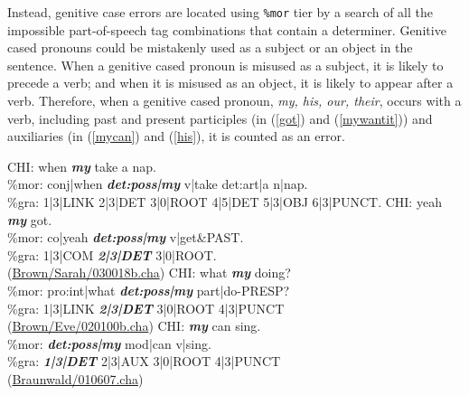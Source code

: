 Instead, genitive case errors are located using \texttt{\%mor} tier by a search of all the impossible part-of-speech tag combinations that contain a determiner. Genitive cased pronouns could be mistakenly used as a subject or an object in the sentence. When a genitive cased pronoun is misused as a subject, it is likely to precede a verb; and when it is misused as an object, it is likely to appear after a verb. Therefore, when a genitive cased pronoun, \textit{my, his, our, their}, occurs with a verb, including past and present participles (in (\ref{got}) and (\ref{mywantit})) and auxiliaries (in (\ref{mycan}) and (\ref{his}), it is counted as an error. 

\begin{exe}
\ex \label{} \gll *CHI:	when \textit{\textbf{my}} take a nap. \\
\%mor:	conj|when \textit{\textbf{det:poss|my}} v|take det:art|a n|nap.\\
\%gra:	1|3|LINK 2|3|DET 3|0|ROOT 4|5|DET 5|3|OBJ 6|3|PUNCT.
\ex \label{got} \gll *CHI: yeah \textit{\textbf{my}} got.\\
\%mor: co|yeah \textit{\textbf{det:poss|my}} v|get&PAST.\\
\%gra: 1|3|COM \textit{\textbf{2|3|DET }} 3|0|ROOT.\\
(\href{https://childes.talkbank.org/browser/index.php?url=Eng-NA/Brown/Sarah/030018b.cha}{Brown/Sarah/030018b.cha})
\ex \label{mywantit} \gll  *CHI: what \textit{\textbf{my}}  doing?  \\     
\%mor:	pro:int|what \textit{\textbf{det:poss|my}} part|do-PRESP?\\
\%gra:	1|3|LINK \textit{\textbf{2|3|DET}} 3|0|ROOT 4|3|PUNCT\\
(\href{https://childes.talkbank.org/browser/index.php?url=Eng-NA/Brown/Eve/020100b.cha}{Brown/Eve/020100b.cha})
\ex \label{mycan} \gll *CHI: \textit{\textbf{my}} can sing.\\
\%mor: \textbf{\textit{det:poss|my}} mod|can v|sing.\\
\%gra: \textit{\textbf{1|3|DET}} 2|3|AUX 3|0|ROOT 4|3|PUNCT\\
(\href{https://childes.talkbank.org/browser/index.php?url=Eng-NA/Braunwald/010607.cha}{Braunwald/010607.cha})


\end{exe}

